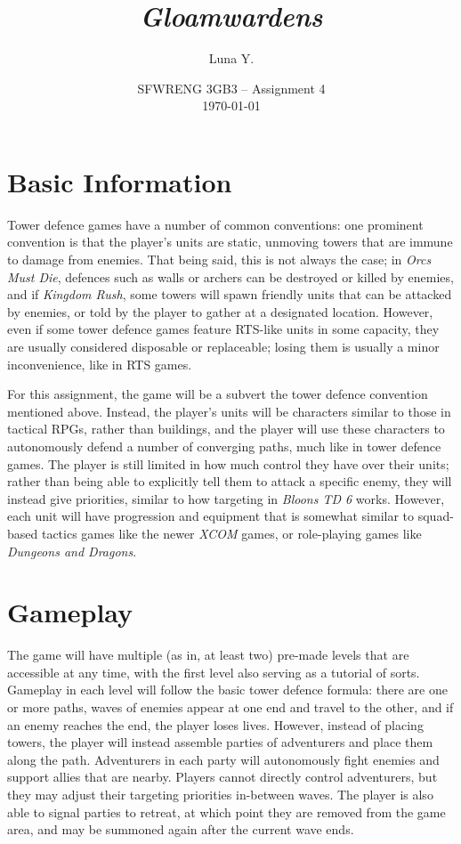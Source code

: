 \documentclass[10pt]{article}
\begin{document}
\title{\textit{Gloamwardens}}
\author{Luna Y.}
\date{
    SFWRENG 3GB3 -- Assignment 4\\[0.25cm]
    \today
}
\maketitle

\tableofcontents

\section{Basic Information}

Tower defence games have a number of common conventions: one prominent convention is that the player's units are static, unmoving towers
that are immune to damage from enemies. That being said, this is not always the case; in \textit{Orcs Must Die}, defences such as walls
or archers can be destroyed or killed by enemies, and if \textit{Kingdom Rush}, some towers will spawn friendly units that can be attacked by
enemies, or told by the player to gather at a designated location. However, even if some tower defence games feature RTS-like units in some
capacity, they are usually considered disposable or replaceable; losing them is usually a minor inconvenience, like in RTS games.

For this assignment, the game will be a subvert the tower defence convention mentioned above. Instead, the player's units will be
characters similar to those in tactical RPGs, rather than buildings, and the player will use these characters to autonomously defend
a number of converging paths, much like in tower defence games. The player is still limited in how much control they have over their units;
rather than being able to explicitly tell them to attack a specific enemy, they will instead give priorities, similar to how targeting
in \textit{Bloons TD 6} works. However, each unit will have progression and equipment that is somewhat similar to squad-based tactics games
like the newer \textit{XCOM} games, or role-playing games like \textit{Dungeons and Dragons}.

\section{Gameplay}

The game will have multiple (as in, at least two) pre-made levels that are accessible at any time, with the first level also serving as a tutorial of sorts.
Gameplay in each level will follow the basic tower defence formula: there are one or more paths, waves of enemies appear at one end and travel to the other,
and if an enemy reaches the end, the player loses lives. However, instead of placing towers, the player will instead assemble parties of adventurers
and place them along the path. Adventurers in each party will autonomously fight enemies and support allies that are nearby. Players cannot directly
control adventurers, but they may adjust their targeting priorities in-between waves. The player is also able to signal parties to retreat, at which point
they are removed from the game area, and may be summoned again after the current wave ends.
\end{document}
